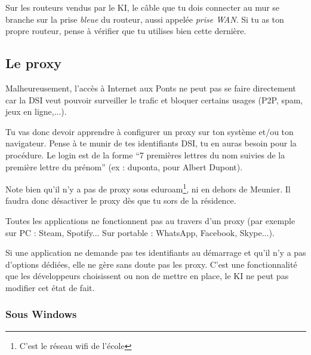 \documentclass{../templates/enpc-ki/ki019}
\begin{document}
    Sur les routeurs vendus par le KI, le câble que tu dois connecter au mur se branche sur la prise \emph{bleue} du routeur, aussi appelée \emph{prise WAN}. Si tu as ton propre routeur, pense à vérifier que tu utilises bien cette dernière.



  \newpage
    \subsection{Le proxy}
    {Malheureusement, l’accès à Internet aux Ponts ne peut pas se faire directement car la DSI veut pouvoir surveiller le trafic et bloquer certains usages (P2P, spam, jeux en ligne,...).}

    Tu vas donc devoir apprendre à configurer un proxy sur ton système et/ou ton navigateur. Pense à te munir de tes identifiants DSI, tu en auras besoin pour la procédure. Le login est de la forme “7 premières lettres du nom suivies de la première lettre du prénom” (ex : duponta, pour Albert Dupont).

    Note bien qu'il n'y a pas de proxy sous eduroam\footnote{C'est le réseau wifi de l'école}, ni en dehors de Meunier. Il faudra donc désactiver le proxy dès que tu sors de la résidence.

    \begin{kiframe}
      Toutes les applications ne fonctionnent pas au travers d'un proxy (par exemple sur PC : Steam, Spotify... Sur portable : WhatsApp, Facebook, Skype...).

      Si une application ne demande pas tes identifiants au démarrage et qu'il n'y a pas d'options dédiées, elle ne gère sans doute pas les proxy. C'est une fonctionnalité que les développeurs choisissent ou non de mettre en place, le KI ne peut pas modifier cet état de fait.
    \end{kiframe}

\newpage
      \subsubsection{Sous Windows}
\end{document}
